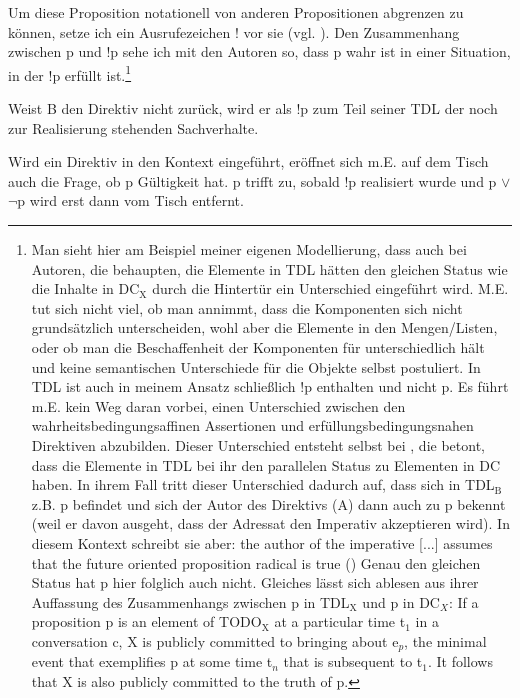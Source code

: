 Um diese Proposition notationell von anderen Propositionen abgrenzen zu können, setze ich ein Ausrufezeichen ! vor sie (vgl. \citealt[54-55, 59 Fn 27]{Beyssade2006}). Den Zusammenhang zwischen p und !p sehe ich mit den Autoren so, dass p wahr ist in einer Situation, in der !p erfüllt ist.\footnote{\label{Fn7}Man sieht hier am Beispiel meiner eigenen Modellierung, dass auch bei Autoren, die behaupten, die Elemente in TDL hätten den gleichen Status wie die Inhalte in $\textrm{DC}_{\textrm{X}}$ \glq durch die Hintertür\grq {} ein Unterschied eingeführt wird. M.E. tut sich nicht viel, ob man annimmt, dass die Komponenten sich nicht grundsätzlich unterscheiden, wohl aber die Elemente in den Mengen/Listen, oder ob man die Beschaffenheit der Komponenten für unterschiedlich hält und keine semantischen Unterschiede für die Objekte selbst postuliert. In TDL ist auch in meinem Ansatz schließlich !p enthalten und nicht p. Es führt m.E. kein Weg daran vorbei, einen Unterschied zwischen den wahrheitsbedingungsaffinen Assertionen und erfüllungsbedingungsnahen Direktiven abzubilden. Dieser Unterschied entsteht selbst bei \citet[323]{Farkas2011}, die betont, dass die Elemente in TDL bei ihr den parallelen Status zu Elementen in DC haben. In ihrem Fall tritt dieser Unterschied dadurch auf, dass sich in TDL$_{\textrm{B}}$ z.B. p befindet und sich der Autor des Direktivs (A) dann auch zu p bekennt (weil er davon ausgeht, dass der Adressat den Imperativ akzeptieren wird). In diesem Kontext schreibt sie aber: \glqq the author of the imperative [...] assumes that the future oriented proposition radical is true\grqq{}  (\citeyear[324]{Farkas2011}) Genau den gleichen Status hat p hier folglich auch nicht. Gleiches lässt sich ablesen aus ihrer Auffassung des Zusammenhangs zwischen p in TDL$_{\textrm{X}}$ und p in DC$_{X}$:  \glqq If a proposition p is an element of TODO$_{\textrm{X}}$ at a particular time t$_{1}$ in a conversation c, X is publicly committed to bringing about e$_{p}$, the minimal event that exemplifies p at some time t$_{n}$ that is subsequent to t$_{1}$. It follows that X is also publicly committed to the truth of p.\grqq{} }

Weist B den Direktiv nicht zurück, wird er als !p zum Teil seiner TDL der noch zur Realisierung stehenden Sachverhalte.

Wird ein Direktiv in den Kontext eingeführt, eröffnet sich m.E. auf dem Tisch auch die Frage, ob p Gültigkeit hat. p trifft zu, sobald !p realisiert wurde und p $\vee$ $\neg$p wird erst dann vom Tisch entfernt.

